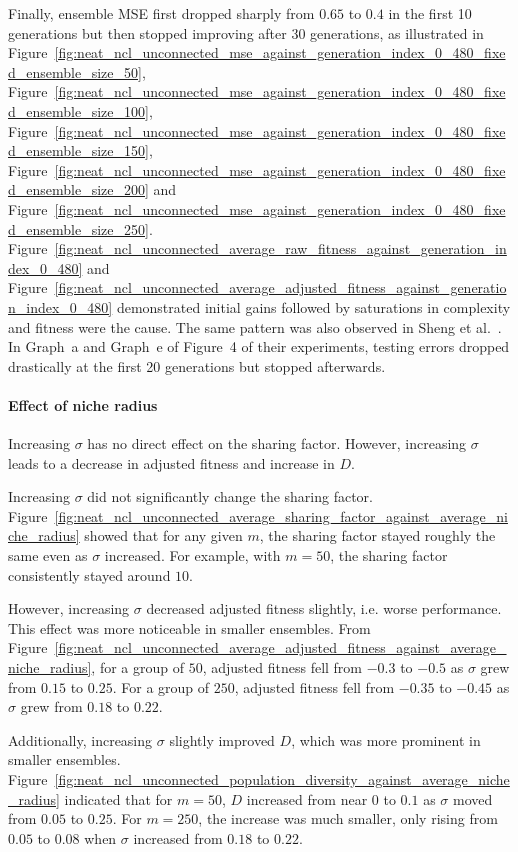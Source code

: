 Finally, ensemble MSE first dropped sharply from $0.65$ to $0.4$ in the first 10 generations but then stopped improving after 30 generations, as illustrated in Figure~\ref{fig:neat_ncl_unconnected_mse_against_generation_index_0_480_fixed_ensemble_size_50}, Figure~\ref{fig:neat_ncl_unconnected_mse_against_generation_index_0_480_fixed_ensemble_size_100}, Figure~\ref{fig:neat_ncl_unconnected_mse_against_generation_index_0_480_fixed_ensemble_size_150}, Figure~\ref{fig:neat_ncl_unconnected_mse_against_generation_index_0_480_fixed_ensemble_size_200} and Figure~\ref{fig:neat_ncl_unconnected_mse_against_generation_index_0_480_fixed_ensemble_size_250}. Figure~\ref{fig:neat_ncl_unconnected_average_raw_fitness_against_generation_index_0_480} and Figure~\ref{fig:neat_ncl_unconnected_average_adjusted_fitness_against_generation_index_0_480} demonstrated initial gains followed by saturations in complexity and fitness were the cause. The same pattern was also observed in Sheng et al.\ \cite{sheng2017niching}. In Graph~a and Graph~e of Figure~4 of their experiments, testing errors dropped drastically at the first 20 generations but stopped afterwards. 

\paragraph{Effect of niche radius}
Increasing $\sigma$ has no direct effect on the sharing factor. However, increasing $\sigma$ leads to a decrease in adjusted fitness and increase in $D$. 

Increasing $\sigma$ did not significantly change the sharing factor. Figure~\ref{fig:neat_ncl_unconnected_average_sharing_factor_against_average_niche_radius} showed that for any given $m$, the sharing factor stayed roughly the same even as $\sigma$ increased. For example, with $m = 50$, the sharing factor consistently stayed around $10$.

However, increasing $\sigma$ decreased adjusted fitness slightly, i.e. worse performance. This effect was more noticeable in smaller ensembles. From Figure~\ref{fig:neat_ncl_unconnected_average_adjusted_fitness_against_average_niche_radius}, for a group of $50$, adjusted fitness fell from $-0.3$ to $-0.5$ as $\sigma$ grew from $0.15$ to $0.25$. For a group of $250$, adjusted fitness fell from $-0.35$ to $-0.45$ as $\sigma$ grew from $0.18$ to $0.22$. 

Additionally, increasing $\sigma$ slightly improved $D$, which was more prominent in smaller ensembles. Figure~\ref{fig:neat_ncl_unconnected_population_diversity_against_average_niche_radius} indicated that for $m = 50$, $D$ increased from near $0$ to $0.1$ as $\sigma$ moved from $0.05$ to $0.25$. For $m = 250$, the increase was much smaller, only rising from $0.05$ to $0.08$ when $\sigma$ increased from $0.18$ to $0.22$. 

